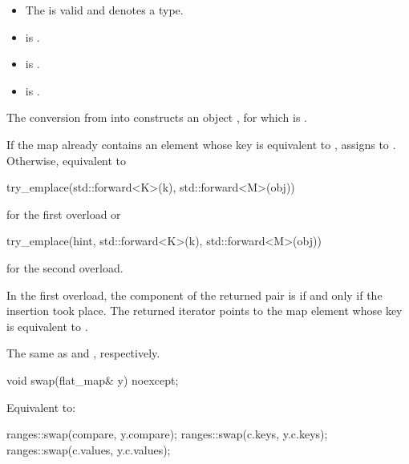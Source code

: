 \begin{itemdescr}
\pnum
\constraints
\begin{itemize}
\item
The  
is valid and denotes a type.
\item
{} is .
\item
{} is .
\item
{} is .
\end{itemize}

\pnum
\expects
The conversion from  into  constructs
an object , for which  is .

\pnum
\effects
If the map already contains an element 
whose key is equivalent to ,
assigns  to .
Otherwise, equivalent to
\begin{codeblock}
try_emplace(std::forward<K>(k), std::forward<M>(obj))
\end{codeblock}
for the first overload or
\begin{codeblock}
try_emplace(hint, std::forward<K>(k), std::forward<M>(obj))
\end{codeblock}
for the second overload.

\pnum
\returns
In the first overload,
the  component of the returned pair is 
if and only if the insertion took place.
The returned iterator points to the map element
whose key is equivalent to .

\pnum
\complexity
The same as  and , respectively.
\end{itemdescr}

%
\begin{itemdecl}
void swap(flat_map& y) noexcept;
\end{itemdecl}

\begin{itemdescr}
\pnum
\effects
Equivalent to:
\begin{codeblock}
ranges::swap(compare, y.compare);
ranges::swap(c.keys, y.c.keys);
ranges::swap(c.values, y.c.values);
\end{codeblock}
\end{itemdescr}

